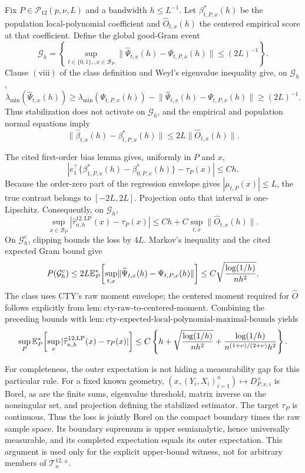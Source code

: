 Fix \(P\in\mathcal P_{12}(p,\nu,L)\) and a bandwidth \(h\leq L^{-1}\).  Let \(\beta^*_{t,P,x}(h)\) be the population local-polynomial coefficient and \(\widehat O_{t,x}(h)\) the centered empirical score at that coefficient.  Define the global good-Gram event
\[
 \mathcal G_h=\left\{
 \sup_{t\in\{0,1\},,x\in\mathcal B_P}
 \lVert\widehat\Psi_{t,x}(h)-\Psi_{t,P,x}(h)\rVert
 \leq(2L)^{-1}
 \right\}.
\]
Clause \(\mathrm{(viii)}\) of the class definition and Weyl's eigenvalue inequality give, on \(\mathcal G_h\),
\[
 \lambda_{\min}(\widehat\Psi_{t,x}(h))
 \geq\lambda_{\min}(\Psi_{t,P,x}(h))
 -\lVert\widehat\Psi_{t,x}(h)-\Psi_{t,P,x}(h)\rVert
 \geq(2L)^{-1}.
\]
Thus stabilization does not activate on \(\mathcal G_h\), and the empirical and population normal equations imply
\[
 \lVert\widehat\beta_{t,x}(h)-\beta^*_{t,P,x}(h)\rVert
 \leq2L\lVert\widehat O_{t,x}(h)\rVert.
\]

The cited first-order bias lemma gives, uniformly in \(P\) and \(x\),
\[
 \left|e_1^\top\{\beta^*_{1,P,x}(h)-\beta^*_{0,P,x}(h)\}-\tau_P(x)\right|\leq Ch.
\]
Because the order-zero part of the regression envelope gives \(|\mu_{t,P}(x)|\leq L\), the true contrast belongs to \([-2L,2L]\).  Projection onto that interval is one-Lipschitz.  Consequently, on \(\mathcal G_h\),
\[
 \sup_{x\in\mathcal B_P}
 |\widehat\tau^{12,\mathrm{LP}}_{n,h}(x)-\tau_P(x)|
 \leq Ch+C\sup_{t,x}\lVert\widehat O_{t,x}(h)\rVert.
\]
On \(\mathcal G_h^c\), clipping bounds the loss by \(4L\).  Markov's inequality and the cited expected Gram bound give
\[
 P(\mathcal G_h^c)
 \leq2L\mathbb E_P^*\!\left[
 \sup_{t,x}\lVert\widehat\Psi_{t,x}(h)-\Psi_{t,P,x}(h)\rVert
 \right]
 \leq C\sqrt{{\log(1/h)\over nh^2}}.
\]
The class uses CTY's raw moment envelope; the centered moment required for \(\widehat O\) follows explicitly from \(\mathrm{lem:cty\text{-}raw\text{-}to\text{-}centered\text{-}moment}\).  Combining the preceding bounds with \(\mathrm{lem:cty\text{-}expected\text{-}local\text{-}polynomial\text{-}maximal\text{-}bounds}\) yields
\[
 \sup_P\mathbb E_P^*\!\left[
 \sup_x|\widehat\tau^{12,\mathrm{LP}}_{n,h}(x)-\tau_P(x)|
 \right]
 \leq C\left\{
 h+\sqrt{{\log(1/h)\over nh^2}}
 +{\log(1/h)\over n^{(1+\nu)/(2+\nu)}h^2}
 \right\}.
\]

For completeness, the outer expectation is not hiding a measurability gap for this particular rule.  For a fixed known geometry, \((x,(Y_i,X_i)_{i=1}^n)\mapsto D^{\pm}_{P,x,i}\) is Borel, as are the finite sums, eigenvalue threshold, matrix inverse on the nonsingular set, and projection defining the stabilized estimator.  The target \(\tau_P\) is continuous.  Thus the loss is jointly Borel on the compact boundary times the raw sample space.  Its boundary supremum is upper semianalytic, hence universally measurable, and its completed expectation equals its outer expectation.  This argument is used only for the explicit upper-bound witness, not for arbitrary members of \(\mathcal T_n^{12,\pm}\).

